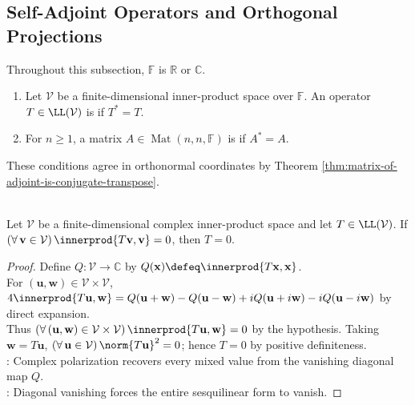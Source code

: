 \subsection{Self-Adjoint Operators and Orthogonal Projections}

Throughout this subsection, $\mathbb{F}$ is $\mathbb{R}$ or $\mathbb{C}$.

\begin{definition} \label{def:self-adjoint-hermitian} 
\begin{enumerate}[label=(\roman*)]
\setlength{\itemsep}{0pt}
\item Let $\mathcal{V}$ be a finite-dimensional inner-product space over $\mathbb{F}$. An operator $T\in\LL(\mathcal{V})$ is  if $T^*=T$.
\item For $n\geq1$, a matrix $A\in\operatorname{Mat}(n,n,\mathbb{F})$ is  if $A^*=A$.
\end{enumerate}
These conditions agree in orthonormal coordinates by Theorem \ref{thm:matrix-of-adjoint-is-conjugate-transpose}.
\end{definition}

\begin{lemma} \label{lem:complex-zero-quadratic-form-implies-zero-operator} \\
Let $\mathcal{V}$ be a finite-dimensional complex inner-product space and let $T\in\LL(\mathcal{V})$. If $(\forall\,\mathbf{v}\in\mathcal{V})\,\innerprod{T\mathbf{v},\mathbf{v}}=0$, then $T=0$.
\begin{proof}
Define $Q:\mathcal{V}\to\mathbb{C}$ by $Q(\mathbf{x})\defeq\innerprod{T\mathbf{x},\mathbf{x}}$.\\
For $(\mathbf{u},\mathbf{w})\in\mathcal{V}\times\mathcal{V}$, $4\innerprod{T\mathbf{u},\mathbf{w}}=Q(\mathbf{u}+\mathbf{w})-Q(\mathbf{u}-\mathbf{w})+iQ(\mathbf{u}+i\mathbf{w})-iQ(\mathbf{u}-i\mathbf{w})$ by direct expansion.\\
Thus $(\forall\,(\mathbf{u},\mathbf{w})\in\mathcal{V}\times\mathcal{V})\,\innerprod{T\mathbf{u},\mathbf{w}}=0$ by the hypothesis. Taking $\mathbf{w}=T\mathbf{u}$, $(\forall\,\mathbf{u}\in\mathcal{V})\,\norm{T\mathbf{u}}^2=0$; hence $T=0$ by positive definiteness.\\
: Complex polarization recovers every mixed value from the vanishing diagonal map $Q$.\\
: Diagonal vanishing forces the entire sesquilinear form to vanish.
\end{proof}
\end{lemma}

